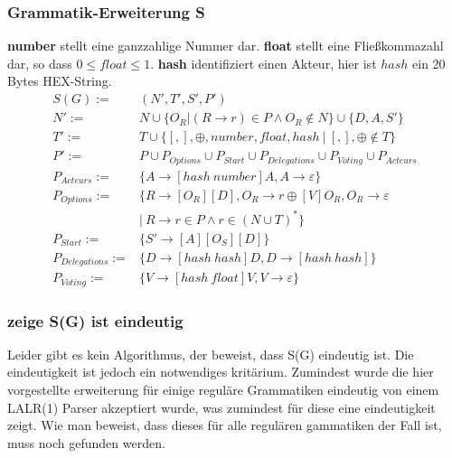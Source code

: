 \documentclass[]{article}
\begin{document}







\subsubsection*{Grammatik-Erweiterung S}


\textbf{number} stellt eine ganzzahlige Nummer dar. \textbf{float}
stellt eine Fließkommazahl dar, so dass $0\leq float \leq 1$. \textbf{hash} identifiziert einen Akteur, hier ist $hash$ ein 20 Bytes HEX-String. \\

\begin{align}
  S(G) :=& (N', T', S', P') \\
  N' :=& N \cup \{ O_R | (R\rightarrow r)\in P\land O_R \notin N\}\cup\{D, A, S'\}\\
  T' :=& T \cup \{[ , ], \oplus, number, float, hash\ |\ [,],\oplus \notin T \}\\
  P' :=& P
  \cup P_{Options} 
  \cup P_{Start} 
  \cup P_{Delegations} 
  \cup P_{Voting} 
  \cup P_{Acteurs}
  \\
  P_{Acteurs} :=& \{A\rightarrow[hash\ number]A,A\rightarrow \varepsilon\} \\
  P_{Options} :=& \{R \rightarrow [O_R][D], O_R \rightarrow r\oplus [V] O_R, O_R \rightarrow \varepsilon \ \nonumber\\
  &\vert\ R\rightarrow r\in P \land r\in (N\cup T)^*\} \\
  P_{Start} :=& \{S'\rightarrow [A][O_S][D]\} \\
  P_{Delegations} :=& \{D\rightarrow [hash\ hash]D,D\rightarrow [hash\ hash]\} \\
  P_{Voting} :=& \{V\rightarrow [hash\ float]V, V \rightarrow \varepsilon\}
\end{align}


\subsubsection*{zeige S(G) ist eindeutig}
Leider gibt es kein Algorithmus, der beweist, dass S(G) eindeutig ist. Die eindeutigkeit ist jedoch ein notwendiges kritärium. Zumindest wurde die hier vorgestellte erweiterung für einige reguläre Grammatiken eindeutig von einem LALR(1) Parser akzeptiert wurde, was zumindest für diese eine eindeutigkeit zeigt. Wie man beweist, dass dieses für alle regulären gammatiken der Fall ist, muss noch gefunden werden.
\end{document}
